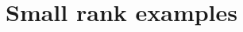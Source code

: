 \documentclass{emsprocart}
\newtheorem{proposition}[theorem]{Proposition}
\newtheorem{example}[theorem]{Example}
\theoremstyle{definition}
\begin{document}


\section{Small rank examples}\label{sec:smallrank}
\end{document}

